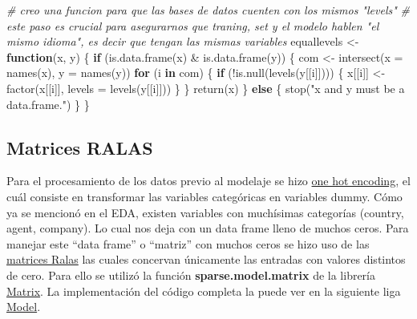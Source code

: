 \documentclass[
]{article}
\newenvironment{Shaded}{\begin{snugshade}}{\end{snugshade}}
\newcommand{\AttributeTok}[1]{\textcolor[rgb]{0.77,0.63,0.00}{#1}}
\newcommand{\CommentTok}[1]{\textcolor[rgb]{0.56,0.35,0.01}{\textit{#1}}}
\newcommand{\ControlFlowTok}[1]{\textcolor[rgb]{0.13,0.29,0.53}{\textbf{#1}}}
\newcommand{\FunctionTok}[1]{\textcolor[rgb]{0.00,0.00,0.00}{#1}}
\newcommand{\NormalTok}[1]{#1}
\newcommand{\OtherTok}[1]{\textcolor[rgb]{0.56,0.35,0.01}{#1}}
\newcommand{\SpecialCharTok}[1]{\textcolor[rgb]{0.00,0.00,0.00}{#1}}
\newcommand{\StringTok}[1]{\textcolor[rgb]{0.31,0.60,0.02}{#1}}
\begin{document}
\begin{Shaded}
\begin{Highlighting}[]
\CommentTok{\# creo una funcion para que las bases de datos cuenten con los mismos "levels"}
\CommentTok{\# este paso es crucial para asegurarnos que traning, set y el modelo hablen "el mismo idioma", es decir que tengan las mismas variables}
\NormalTok{equallevels }\OtherTok{\textless{}{-}} \ControlFlowTok{function}\NormalTok{(x, y) \{}
    \ControlFlowTok{if}\NormalTok{ (}\FunctionTok{is.data.frame}\NormalTok{(x) }\SpecialCharTok{\&} \FunctionTok{is.data.frame}\NormalTok{(y)) \{}
\NormalTok{        com }\OtherTok{\textless{}{-}} \FunctionTok{intersect}\NormalTok{(}\AttributeTok{x =} \FunctionTok{names}\NormalTok{(x), }\AttributeTok{y =} \FunctionTok{names}\NormalTok{(y))}
        \ControlFlowTok{for}\NormalTok{ (i }\ControlFlowTok{in}\NormalTok{ com) \{}
            \ControlFlowTok{if}\NormalTok{ (}\SpecialCharTok{!}\FunctionTok{is.null}\NormalTok{(}\FunctionTok{levels}\NormalTok{(y[[i]]))) \{}
\NormalTok{                x[[i]] }\OtherTok{\textless{}{-}} \FunctionTok{factor}\NormalTok{(x[[i]], }\AttributeTok{levels =} \FunctionTok{levels}\NormalTok{(y[[i]]))}
\NormalTok{            \}}
\NormalTok{        \}}
        \FunctionTok{return}\NormalTok{(x)}
\NormalTok{    \} }\ControlFlowTok{else}\NormalTok{ \{}
        \FunctionTok{stop}\NormalTok{(}\StringTok{"\textasciigrave{}x\textasciigrave{} and \textasciigrave{}y\textasciigrave{} must be a data.frame."}\NormalTok{)}
\NormalTok{    \}}
\NormalTok{\}}
\end{Highlighting}
\end{Shaded}

\hypertarget{matrices-ralas}{%
\subsection{Matrices RALAS}\label{matrices-ralas}}

Para el procesamiento de los datos previo al modelaje se hizo
\href{https://www.educative.io/blog/one-hot-encoding}{one hot encoding},
el cuál consiste en transformar las variables categóricas en variables
dummy. Cómo ya se mencionó en el EDA, existen variables con muchísimas
categorías (country, agent, company). Lo cual nos deja con un data frame
lleno de muchos ceros. Para manejar este ``data frame'' o ``matriz'' con
muchos ceros se hizo uso de las
\href{http://amunategui.github.io/sparse-matrix-glmnet/}{matrices Ralas}
las cuales concervan únicamente las entradas con valores distintos de
cero. Para ello se utilizó la función \textbf{sparse.model.matrix} de la
librería
\href{https://cran.rproject.org/web/packages/Matrix/index.html}{Matrix}.
La implementación del código completa la puede ver en la siguiente liga
\href{https://github.com/marcoyel21/hotel_cancelation_ML21/blob/main/final/modelo_final\%20.Rmd}{Model}.
\end{document}
